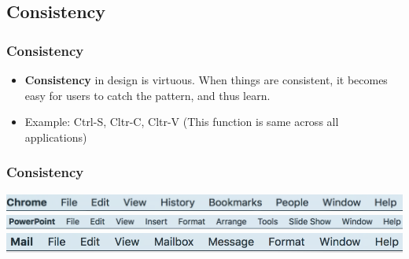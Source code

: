 \documentclass{beamer}
\begin{document}

\subsection{Consistency}

\begin{frame}
\frametitle{Consistency}
\begin{itemize}
	\item \textbf{Consistency} in design is virtuous.  When things are consistent, it becomes easy for users to catch the pattern, and thus learn. 
	\item Example: Ctrl-S, Cltr-C, Cltr-V   (This function is same across all applications)
\end{itemize}
\end{frame}

\begin{frame}
\frametitle{Consistency}

\includegraphics[width=0.8\linewidth]{consistent3}
\includegraphics[width=0.8\linewidth]{consistent4}
\includegraphics[width=0.7\linewidth]{consistent5}
\end{frame}
\end{document}
